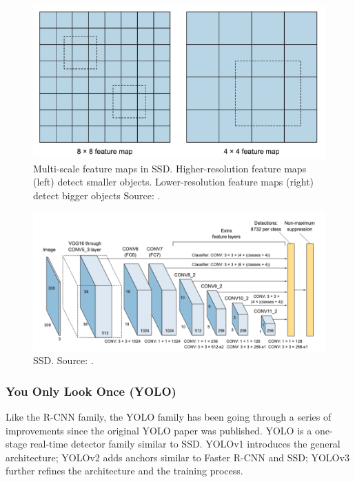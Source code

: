 \documentclass[a4paper, 11pt, oneside]{article}
\begin{document}
\begin{figure}[ht]
  \begin{center}
    \includegraphics[width=.8\textwidth]{ssd_feature_maps.png}
  \end{center}
  \caption{Multi-scale feature maps in SSD. Higher-resolution feature maps (left) detect smaller objects.
  Lower-resolution feature maps (right) detect bigger objects Source: \cite{elgendy2020deep}.}
\end{figure}

\begin{figure}[ht]
  \begin{center}
    \includegraphics[width=.8\textwidth]{ssd.png}
  \end{center}
  \caption{SSD. Source: \cite{elgendy2020deep}.}
\end{figure}

\subsubsection{You Only Look Once (YOLO)}

Like the R-CNN family, the YOLO family has been going through a series of improvements since the original YOLO paper
was published. YOLO is a one-stage real-time detector family similar to SSD. YOLOv1 \cite{redmon2016you} introduces the
general architecture; YOLOv2 \cite{redmon2017yolo9000} adds anchors similar to Faster R-CNN and SSD; YOLOv3
\cite{redmon2018yolov3} further refines the architecture and the training process.
\end{document}
